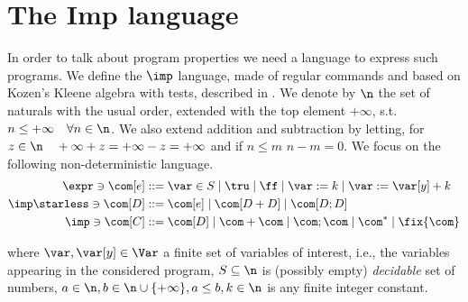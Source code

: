 \section{The Imp language}

In order to talk about program properties we need a language to
express such programs. We define the \(\imp\) language, made of
regular commands and based on Kozen’s Kleene algebra with tests,
described in \cite{kozen1997kleene}.  We denote by \(\n\) the set of
naturals with the usual order, extended with the top element
\(+\infty\), s.t.  \(n \leq +\infty \quad \forall n \in \n\). We also
extend addition and subtraction by letting, for
\(z \in \n \quad +\infty + z = + \infty - z = + \infty\) and if
\(n \leq m\) \(n - m = 0\).  We focus on the following
non-deterministic language.
\begin{align*}
  \expr \ni \com[e] ::= & \; \var \in S \mid \tru \mid \ff \mid \var := k \mid \var := \var[y] + k \\
  \imp\starless \ni \com[D] ::= & \; \com[e] \mid \com[D + D] \mid \com[D ; D] \\
  \imp \ni \com[C] ::= & \; \com[D] \mid \com + \com \mid \com ; \com \mid \com^* \mid \fix{\com}
\end{align*}

where \(\var, \var[y] \in \Var\) a finite set of variables of
interest, i.e., the variables appearing in the considered program,
\(S\subseteq \n\) is (possibly empty) \emph{decidable} set of numbers,
\(a \in \n, b\in\n\cup\{+\infty\}, a\leq b, k \in \n\)
is any finite integer constant.

